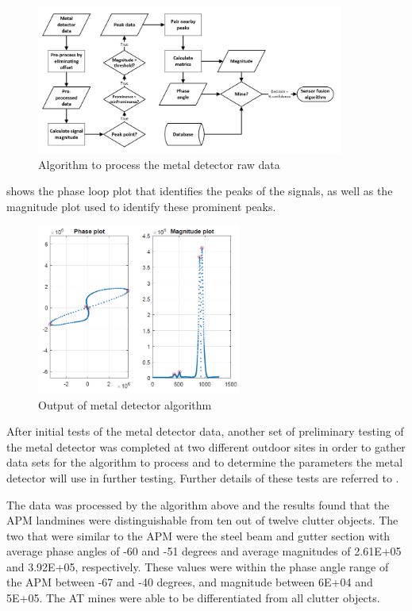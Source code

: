 \documentclass[main.tex]{subfiles}
\begin{document}
\begin{figure}[ht]
\includegraphics[width=0.9\textwidth]{4-DetailedDesign/MDflow.PNG}
\centering
\caption{Algorithm to process the metal detector raw data}
\end{figure}

 shows the phase loop plot that identifies the peaks of the signals, as well as the magnitude plot used to identify these prominent peaks.

\begin{figure}[ht]
\includegraphics[width=0.6\textwidth]{4-DetailedDesign/phase.PNG}
\centering
\caption{Output of metal detector algorithm} 
\end{figure}

After initial tests of the metal detector data, another set of preliminary testing of the metal detector was completed at two different outdoor sites in order to gather data sets for the algorithm to process and to determine the parameters the metal detector will use in further testing. Further details of these tests are referred to . 

The data was processed by the algorithm above and the results found that the APM landmines were distinguishable from ten out of twelve clutter objects. The two that were similar to the APM were the steel beam and gutter section with average phase angles of -60 and -51 degrees and average magnitudes of 2.61E+05 and 3.92E+05, respectively. These values were within the phase angle range of the APM between -67 and -40 degrees, and magnitude between 6E+04 and 5E+05. The AT mines were able to be differentiated from all clutter objects. 
\end{document}
